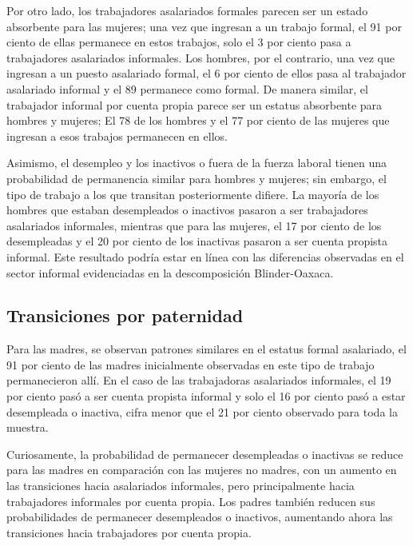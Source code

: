 Por otro lado, los trabajadores asalariados formales parecen ser un estado absorbente para las mujeres; una vez que ingresan a un trabajo formal, el 91 por ciento de ellas permanece en estos trabajos, solo el 3 por ciento pasa a trabajadores asalariados informales. Los hombres, por el contrario, una vez que ingresan a un puesto asalariado formal, el 6 por ciento de ellos pasa al trabajador asalariado informal y el 89 permanece como formal. De manera similar, el trabajador informal por cuenta propia parece ser un estatus absorbente para hombres y mujeres; El 78 de los hombres y el 77 por ciento de las mujeres que ingresan a esos trabajos permanecen en ellos.

Asimismo, el desempleo y los inactivos o fuera de la fuerza laboral tienen una probabilidad de permanencia similar para hombres y mujeres; sin embargo, el tipo de trabajo a los que transitan posteriormente difiere. La mayoría de los hombres que estaban desempleados o inactivos pasaron a ser trabajadores asalariados informales, mientras que para las mujeres, el 17 por ciento de los desempleadas y el 20 por ciento de los inactivas pasaron a ser cuenta propista informal. Este resultado podría estar en línea con las diferencias observadas en el sector informal evidenciadas en la descomposición Blinder-Oaxaca.
\subsection{Transiciones por paternidad}
Para las madres, se observan patrones similares en el estatus formal asalariado, el 91 por ciento de las madres inicialmente observadas en este tipo de trabajo permanecieron allí. En el caso de las trabajadoras asalariados informales, el 19 por ciento pasó a ser cuenta propista informal y solo el 16 por ciento pasó a estar desempleada o inactiva, cifra menor que el 21 por ciento observado para toda la muestra.

Curiosamente, la probabilidad de permanecer desempleadas o inactivas se reduce para las madres en comparación con las mujeres no madres, con un aumento en las transiciones hacia asalariados informales, pero principalmente hacia trabajadores informales por cuenta propia. Los padres también reducen sus probabilidades de permanecer desempleados o inactivos, aumentando ahora las transiciones hacia trabajadores por cuenta propia.

